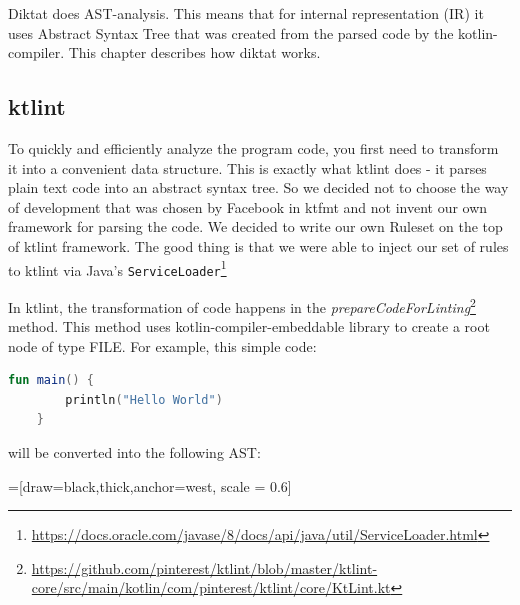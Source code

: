 Diktat does AST-analysis. This means that for internal representation (IR) it uses Abstract Syntax Tree that was created from the parsed code by the kotlin-compiler. This chapter describes how diktat works.

\subsection{ktlint}
To quickly and efficiently analyze the program code, you first need to transform it into a convenient data structure. This is exactly what ktlint does - it parses plain text code into an abstract syntax tree. So we decided not to choose the way of development that was chosen by Facebook in ktfmt and not invent our own framework for parsing the code. We decided to write our own Ruleset on the top of ktlint framework. The good thing is that we were able to inject our set of rules to ktlint via Java's \texttt{ServiceLoader}\footnote{\url{https://docs.oracle.com/javase/8/docs/api/java/util/ServiceLoader.html}}

 In ktlint, the transformation of code happens in the \textsl{prepareCodeForLinting}\footnote{\url{https://github.com/pinterest/ktlint/blob/master/ktlint-core/src/main/kotlin/com/pinterest/ktlint/core/KtLint.kt}} method. This method uses kotlin-compiler-embeddable library to create a root node of type FILE.
For example, this simple code:
\begin{lstlisting}[caption={Simple function that will be transformed to AST}, label={lst:example1}, language=Kotlin]
	fun main() {
		println("Hello World")
	}
\end{lstlisting}

will be converted into the following AST:

=[draw=black,thick,anchor=west, scale = 0.6]
  
